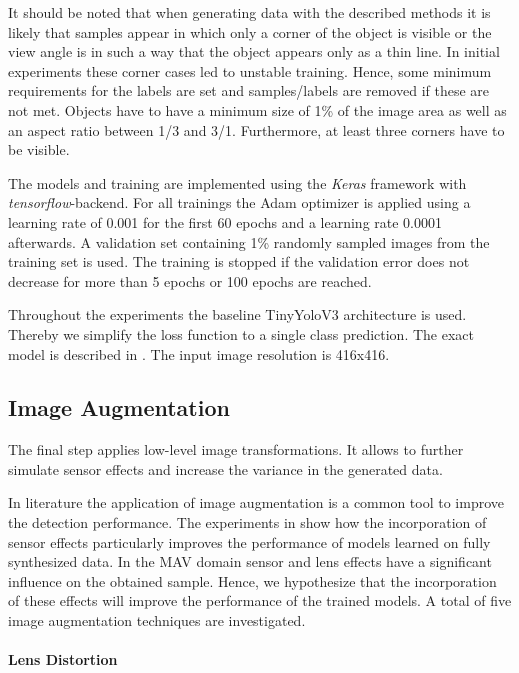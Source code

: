It should be noted that when generating data with the described methods it is likely that samples appear in which only a corner of the object is visible or the view angle is in such a way that the object appears only as a thin line. In initial experiments these corner cases led to unstable training. Hence, some minimum requirements for the labels are set and samples/labels are removed if these are not met. Objects have to have a minimum size of 1\% of the image area as well as an aspect ratio between 1/3 and 3/1. Furthermore, at least three corners have to be visible.

The models and training are implemented using the \textit{Keras} framework with \textit{tensorflow}-backend. For all trainings the Adam optimizer is applied using a learning rate of 0.001 for the first 60 epochs and a learning rate 0.0001 afterwards. A validation set containing 1\% randomly sampled images from the training set is used. The training is stopped if the validation error does not decrease for more than 5 epochs or 100 epochs are reached.

Throughout the experiments the baseline TinyYoloV3 architecture is used. Thereby we simplify the loss function to a single class prediction. The exact model is described in . The input image resolution is 416x416.

\subsection{Image Augmentation}

The final step applies low-level image transformations. It allows to further simulate sensor effects and increase the variance in the generated data.

In literature \cite{Krizhevsky2012a,Howard2013,Redmon,Liu} the application of image augmentation is a common tool to improve the detection performance. The experiments in \cite{Carlson2018} show how the incorporation of sensor effects particularly improves the performance of models learned on fully synthesized data. In the \ac{MAV} domain sensor and lens effects have a significant influence on the obtained sample. Hence, we hypothesize that the incorporation of these effects will improve the performance of the trained models. A total of  five image augmentation techniques are investigated.

\paragraph{Lens Distortion}

